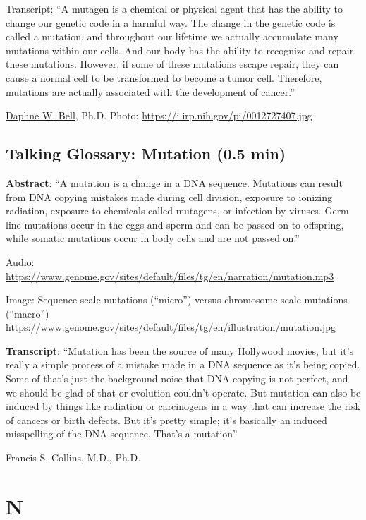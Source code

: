 \documentclass[
]{book}
\begin{document}
Transcript: ``A mutagen is a chemical or physical agent that has the ability to change our genetic code in a harmful way. The change in the genetic code is called a mutation, and throughout our lifetime we actually accumulate many mutations within our cells. And our body has the ability to recognize and repair these mutations. However, if some of these mutations escape repair, they can cause a normal cell to be transformed to become a tumor cell. Therefore, mutations are actually associated with the development of cancer.''

\href{https://irp.nih.gov/pi/daphne-bell}{Daphne W. Bell}, Ph.D.
Photo: \url{https://i.irp.nih.gov/pi/0012727407.jpg}

\hypertarget{talking-glossary-mutation-0.5-min}{%
\section{Talking Glossary: Mutation (0.5 min)}\label{talking-glossary-mutation-0.5-min}}

\textbf{Abstract}: ``A mutation is a change in a DNA sequence. Mutations can result from DNA copying mistakes made during cell division, exposure to ionizing radiation, exposure to chemicals called mutagens, or infection by viruses. Germ line mutations occur in the eggs and sperm and can be passed on to offspring, while somatic mutations occur in body cells and are not passed on.''

Audio: \url{https://www.genome.gov/sites/default/files/tg/en/narration/mutation.mp3}

Image: Sequence-scale mutations (``micro'') versus chromosome-scale mutations (``macro'')
\url{https://www.genome.gov/sites/default/files/tg/en/illustration/mutation.jpg}

\textbf{Transcript}: ``Mutation has been the source of many Hollywood movies, but it's really a simple process of a mistake made in a DNA sequence as it's being copied. Some of that's just the background noise that DNA copying is not perfect, and we should be glad of that or evolution couldn't operate. But mutation can also be induced by things like radiation or carcinogens in a way that can increase the risk of cancers or birth defects. But it's pretty simple; it's basically an induced misspelling of the DNA sequence. That's a mutation''

Francis S. Collins, M.D., Ph.D.

\hypertarget{n}{%
\chapter{N}\label{n}}
\end{document}
